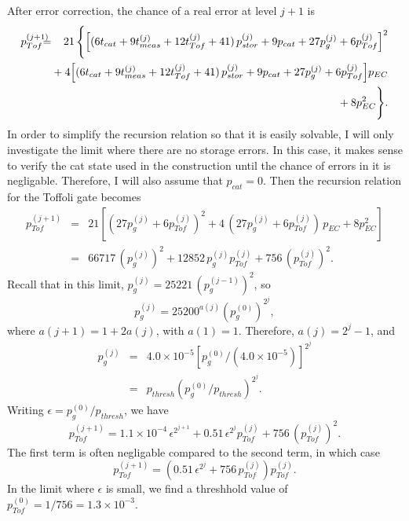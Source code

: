 \documentclass{report}
\newcommand{\ptj}[1]{p_{Tof}^{({#1})}}
\newcommand{\pgj}[1]{p_g^{({#1})}}
\newcommand{\psj}[1]{p_{stor}^{({#1})}}
\newcommand{\ttj}[1]{t_{Tof}^{({#1})}}
\newcommand{\tmj}[1]{t_{meas}^{({#1})}}
\begin{document}
After error correction, the chance of a real error at level $j+1$ is
\begin{eqnarray}
\ptj{j+1} & \!\!\!\!\! = & \!\!\!\!\! 21\,\Bigg\{ \!\left[(6 t_{cat} + 9 
\tmj{j} + 12 \ttj{j} + 41)\,\psj{j} + 9 p_{cat} + 27 \pgj{j} + 6 
\ptj{j}\right]^2 \nonumber \nopagebreak \\
& & \!\!\!\!\!\! \mbox{} + 4 \! \left[ (6 t_{cat} + 9 \tmj{j} + 12 \ttj{j} + 
41)\,\psj{j} + 9 p_{cat} + 27 \pgj{j} + 6 \ptj{j}\right] \! p_{EC} \nonumber 
\nopagebreak \\
& & \!\!\!\!\!\! \mbox{} + 8 p_{EC}^2 \Bigg\}.
\end{eqnarray}
In order to simplify the recursion relation so that it is easily solvable,
I will only investigate the limit where there are no storage errors.  In
this case, it makes sense to verify the cat state used in the construction
until the chance of errors in it is negligable.  Therefore, I will also
assume that $p_{cat} = 0$.  Then the recursion relation for the Toffoli
gate becomes
\begin{eqnarray}
\ptj{j+1} & = & 21 \left[ (27 \pgj{j} + 6 \ptj{j})^2 + 4\,(27 \pgj{j} +
6 \ptj{j})\,p_{EC} + 8 p_{EC}^2 \right] \\
& = & 66717\,(\pgj{j})^2 + 12852\,\pgj{j} \ptj{j} + 756\,(\ptj{j})^2.
\end{eqnarray}
Recall that in this limit, $\pgj{j} = 25221\,(\pgj{j-1})^2$, so
\begin{equation}
\pgj{j} = 25200^{a(j)} (\pgj{0})^{2^j},
\end{equation}
where $a(j+1) = 1 + 2a(j)$, with $a(1) = 1$.  Therefore, $a(j) = 2^j - 1$,
and
\begin{eqnarray}
\pgj{j} & = & 4.0 \times 10^{-5} 
\left[ \pgj{0}/ (4.0 \times 10^{-5}) \right]^{2^j} \\
& = & p_{thresh} \left( \pgj{0}/p_{thresh} \right)^{2^j}.
\end{eqnarray}
Writing $\epsilon = \pgj{0}/p_{thresh}$, we have
\begin{equation}
\ptj{j+1} = 1.1 \times 10^{-4}\,\epsilon^{2^{j+1}} + 0.51\,\epsilon^{2^j} 
\ptj{j} + 756\,(\ptj{j})^2.
\end{equation}
The first term is often negligable compared to the second term, in which case
\begin{equation}
\ptj{j+1} = \left( 0.51\,\epsilon^{2^j} + 756\,\ptj{j} \right) \ptj{j}.
\end{equation}
In the limit where $\epsilon$ is small, we find a threshhold value of
$\ptj{0} = 1/756 = 1.3 \times 10^{-3}$.
\end{document}
